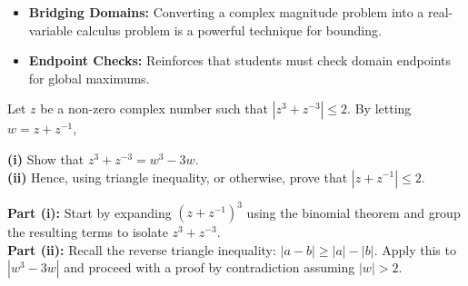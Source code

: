 \begin{takeaways}
\begin{itemize}[leftmargin=*]
    \item \textbf{Bridging Domains:} Converting a complex magnitude problem into a real-variable calculus problem is a powerful technique for bounding.
    \item \textbf{Endpoint Checks:} Reinforces that students must check domain endpoints for global maximums.
\end{itemize}
\end{takeaways}

\begin{problem}
Let $z$ be a non-zero complex number such that $|z^3 + z^{-3}| \leq 2$.
By letting $w = z + z^{-1}$, 

\textbf{(i)} Show that $z^3 + z^{-3} = w^3 - 3w$. \\
\textbf{(ii)} Hence, using triangle inequality, or otherwise, prove that $|z + z^{-1}| \leq 2$.
\end{problem}

\begin{hint}
\textbf{Part (i):} Start by expanding $(z + z^{-1})^3$ using the binomial theorem and group the resulting terms to isolate $z^3 + z^{-3}$. \\
\textbf{Part (ii):} Recall the reverse triangle inequality: $|a - b| \ge |a| - |b|$. Apply this to $|w^3 - 3w|$ and proceed with a proof by contradiction assuming $|w| > 2$.
\end{hint}


